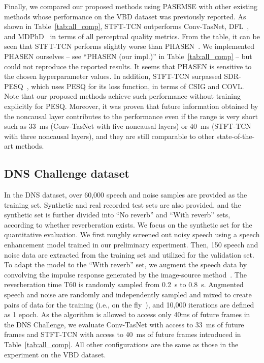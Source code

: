 \documentclass[a4paper]{article}
\begin{document}
\begin{spacing}{0.915}
Finally, we compared our proposed methods using PASEMSE with other existing methods whose performance on the VBD dataset was previously reported.
As shown in Table~\ref{tab:all_comp},
STFT-TCN outperforms Conv-TasNet, DFL~\cite{germain2018speech}, and MDPhD~\cite{kim2018multi} in terms of all perceptual quality metrics.
From the table, it can be seen that STFT-TCN performs slightly worse than PHASEN~\cite{yin2019phasen}. We implemented PHASEN ourselves -- see ``PHASEN (our impl.)'' in Table~\ref{tab:all_comp} -- but could not reproduce the reported results. It seems that PHASEN is sensitive to the chosen hyperparameter values.
In addition, STFT-TCN surpassed SDR-PESQ~\cite{kim2019end}, which uses PESQ for its loss function, in terms of CSIG and COVL.
Note that our proposed methods achieve such performance without training explicitly for PESQ. 
Moreover, it was proven that future information obtained by the noncausal layer contributes to the performance even if the range is very short such as 33~ms (Conv-TasNet with five noncausal layers) or 40~ms (STFT-TCN with three noncausal layers), and they are still comparable to other state-of-the-art methods.

\subsection{DNS Challenge dataset}
In the DNS dataset, over 60,000 speech and noise samples are provided as the training set.
Synthetic and real recorded test sets are also provided, and the synthetic set is further divided into ``No reverb'' and ``With reverb'' sets, according to whether reverberation exists.
We focus on the synthetic set for the quantitative evaluation.
We first roughly screened out noisy speech using a speech enhancement model trained in our preliminary experiment.
Then, 150 speech and noise data are extracted from the training set and utilized for the validation set.
To adapt the model to the ``With reverb'' set, we augment the speech data by convolving the impulse response generated by the image-source method~\cite{lehmann2008prediction}.
The reverberation time T60 is randomly sampled from 0.2~s to 0.8~s.
Augmented speech and noise are randomly and independently sampled and mixed to create pairs of data for the training (i.e., on the fly~\cite{erdogan2018investigations}), and 10,000 iterations are defined as 1 epoch.
As the algorithm is allowed to access only 40ms of future frames in the DNS Challenge, we evaluate Conv-TasNet with access to 33~ms of future frames and STFT-TCN with access to 40~ms of future frames introduced in Table~\ref{tab:all_comp}.
All other configurations are the same as those in the experiment on the VBD dataset.


\end{spacing}
\end{document}
